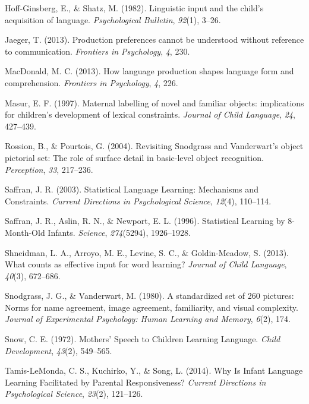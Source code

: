 \documentclass[10pt, letterpaper]{article}
\begin{document}
\hypertarget{ref-hoff-ginsberg1982}{}
Hoff-Ginsberg, E., \& Shatz, M. (1982). Linguistic input and the child's
acquisition of language. \emph{Psychological Bulletin}, \emph{92}(1),
3--26.

\hypertarget{ref-jaeger2013}{}
Jaeger, T. (2013). Production preferences cannot be understood without
reference to communication. \emph{Frontiers in Psychology}, \emph{4},
230.

\hypertarget{ref-macdonald2013}{}
MacDonald, M. C. (2013). How language production shapes language form
and comprehension. \emph{Frontiers in Psychology}, \emph{4}, 226.

\hypertarget{ref-masur1997}{}
Masur, E. F. (1997). Maternal labelling of novel and familiar objects:
implications for children's development of lexical constraints.
\emph{Journal of Child Language}, \emph{24}, 427--439.

\hypertarget{ref-rossion2004}{}
Rossion, B., \& Pourtois, G. (2004). Revisiting Snodgrass and
Vanderwart's object pictorial set: The role of surface detail in
basic-level object recognition. \emph{Perception}, \emph{33}, 217--236.

\hypertarget{ref-saffran2003}{}
Saffran, J. R. (2003). Statistical Language Learning: Mechanisms and
Constraints. \emph{Current Directions in Psychological Science},
\emph{12}(4), 110--114.

\hypertarget{ref-saffran1996}{}
Saffran, J. R., Aslin, R. N., \& Newport, E. L. (1996). Statistical
Learning by 8-Month-Old Infants. \emph{Science}, \emph{274}(5294),
1926--1928.

\hypertarget{ref-shneidman2013}{}
Shneidman, L. A., Arroyo, M. E., Levine, S. C., \& Goldin-Meadow, S.
(2013). What counts as effective input for word learning? \emph{Journal
of Child Language}, \emph{40}(3), 672--686.

\hypertarget{ref-snodgrass1980}{}
Snodgrass, J. G., \& Vanderwart, M. (1980). A standardized set of 260
pictures: Norms for name agreement, image agreement, familiarity, and
visual complexity. \emph{Journal of Experimental Psychology: Human
Learning and Memory}, \emph{6}(2), 174.

\hypertarget{ref-snow1972}{}
Snow, C. E. (1972). Mothers' Speech to Children Learning Language.
\emph{Child Development}, \emph{43}(2), 549--565.

\hypertarget{ref-tamis-lemonda2014}{}
Tamis-LeMonda, C. S., Kuchirko, Y., \& Song, L. (2014). Why Is Infant
Language Learning Facilitated by Parental Responsiveness? \emph{Current
Directions in Psychological Science}, \emph{23}(2), 121--126.
\end{document}
